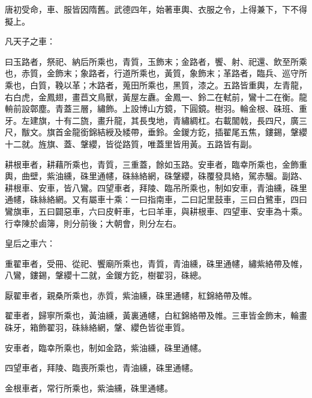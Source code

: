 
\begin{pinyinscope}

 唐初受命，車、服皆因隋舊。武德四年，始著車輿、衣服之令，上得兼下，下不得擬上。



 凡天子之車：



 曰玉路者，祭祀、納后所乘也，青質，玉飾末；金路者，饗、射、祀還、飲至所乘也，赤質，金飾末；象路者，行道所乘也，黃質，象飾末；革路者，臨兵、巡守所乘也，白質，鞔以革；木路者，蒐田所乘也，黑質，漆之。五路皆重輿，左青龍，右白虎，金鳳翅，畫苣文鳥獸，黃屋左纛。金鳳一、鈴二在軾前，鸞十二在衡。龍輈前設鄣塵。青蓋三層，繡飾。上設博山方鏡，下圓鏡。樹羽。輪金根、硃班、重牙。左建旗，十有二旒，畫升龍，其長曳地，青繡綢杠。右載闟戟，長四尺，廣三尺，黻文。旗首金龍銜錦結綬及緌帶，垂鈴。金鍐方釳，插翟尾五焦，鏤錫，鞶纓十二就。旌旗、蓋、鞶纓，皆從路質，唯蓋里皆用黃。五路皆有副。



 耕根車者，耕藉所乘也，青質，三重蓋，餘如玉路。安車者，臨幸所乘也，金飾重輿，曲壁，紫油纁，硃里通幰，硃絲絡網，硃鞶纓，硃覆發具絡，駕赤騮。副路、耕根車、安車，皆八鸞。四望車者，拜陵、臨吊所乘也，制如安車，青油纁，硃里通幰，硃絲絡網。又有屬車十乘：一曰指南車，二曰記里鼓車，三曰白鷺車，四曰鸞旗車，五曰闢惡車，六曰皮軒車，七曰羊車，與耕根車、四望車、安車為十乘。行幸陳於鹵簿，則分前後；大朝會，則分左右。



 皇后之車六：



 重翟車者，受冊、從祀、饗廟所乘也，青質，青油纁，硃里通幰，繡紫絡帶及帷，八鸞，鏤錫，鞶纓十二就，金鍐方釳，樹翟羽，硃總。



 厭翟車者，親桑所乘也，赤質，紫油纁，硃里通幰，紅錦絡帶及帷。



 翟車者，歸寧所乘也，黃油纁，黃裏通幰，白紅錦絡帶及帷。三車皆金飾末，輪畫硃牙，箱飾翟羽，硃絲絡網，鞶、纓色皆從車質。



 安車者，臨幸所乘也，制如金路，紫油纁，硃里通幰。



 四望車者，拜陵、臨喪所乘也，青油纁，硃里通幰。



 金根車者，常行所乘也，紫油纁，硃里通幰。




\end{pinyinscope}
